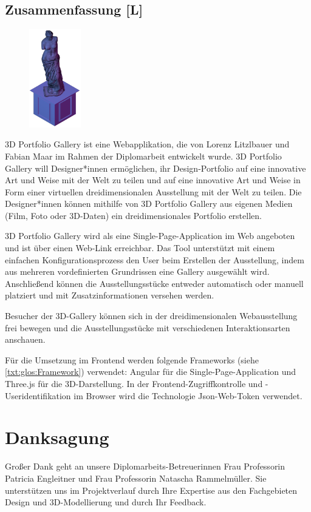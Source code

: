 \newpage
\begin{spacing}{1}
    \chapter*{Zusammenfassung [L]}
\end{spacing}
\begin{figure}
    \begin{center}
      \includegraphics[width=0.2\textwidth]{pics/statue.png}
    \end{center}
\end{figure}
3D Portfolio Gallery ist eine Webapplikation, die von Lorenz Litzlbauer und Fabian Maar im Rahmen der Diplomarbeit entwickelt wurde. 3D Portfolio Gallery will Designer*innen ermöglichen, ihr Design-Portfolio auf eine innovative Art und Weise mit der Welt zu teilen und auf eine innovative Art und Weise in Form einer virtuellen dreidimensionalen Ausstellung mit der Welt zu teilen. Die Designer*innen können mithilfe von 3D Portfolio Gallery aus eigenen Medien (Film, Foto oder 3D-Daten) ein dreidimensionales Portfolio erstellen.

3D Portfolio Gallery wird als eine Single-Page-Application im Web angeboten und ist über einen Web-Link erreichbar. Das Tool unterstützt mit einem einfachen Konfigurationsprozess den User beim Erstellen der Ausstellung, indem aus mehreren vordefinierten Grundrissen eine Gallery ausgewählt wird. Anschließend können die Ausstellungsstücke entweder automatisch oder manuell platziert und mit Zusatzinformationen versehen werden.

Besucher der 3D-Gallery können sich in der dreidimensionalen Webausstellung frei bewegen und die Ausstellungsstücke mit verschiedenen Interaktionsarten anschauen.

Für die Umsetzung im Frontend werden folgende Frameworks (siehe \ref{txt:glos:Framework}) verwendet: Angular für die Single-Page-Application und Three.js für die 3D-Darstellung. In der Frontend-Zugriffkontrolle und -Useridentifikation im Browser wird die Technologie Json-Web-Token verwendet.

\chapter*{Danksagung}
Großer Dank geht an unsere Diplomarbeits-Betreuerinnen
Frau Professorin Patricia Engleitner und Frau Professorin Natascha Rammelmüller. Sie unterstützen uns im Projektverlauf durch Ihre Expertise aus den Fachgebieten Design und 3D-Modellierung und durch Ihr Feedback.
